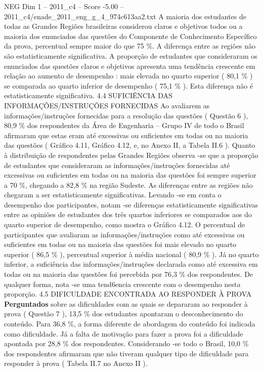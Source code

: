 \begin{textsample}{NEG Dim 1 – 2011\_c4 – Score -5.00 – 2011\_c4/enade\_2011\_eng\_g\_4\_974c613aa2.txt}
A maioria dos estudantes de todas as Grandes Regiões brasileiras considerou claros e objetivos todos ou a maioria dos enunciados das questões do Componente de Conhecimento Específico da prova, percentual sempre maior do que 75 \%.
A diferença entre as regiões não são estatisticamente significativa.
A proporção de estudantes que consideraram os enunciados das questões claros e objetivos apresenta uma tendência crescente em relação ao aumento de desempenho : mais elevada no quarto superior ( 80,1 \% ) se comparada ao quarto inferior de desempenho ( 75,1 \% ).
Esta diferença não é estatisticamente significativa. 4.4 SUFICIÊNCIA DAS INFORMAÇÕES/INSTRUÇÕES FORNECIDAS Ao avaliarem as informações/instruções fornecidas para a resolução das questões ( Questão 6 ), 80,9 \% dos respondentes da Área de Engenharia – Grupo IV de todo o Brasil afirmaram que estas eram até excessivas ou suficientes em todas ou na maioria das questões ( Gráfico 4.11, Gráfico 4.12, e, no Anexo II, a Tabela II.6 ).
Quanto à distribuição de respondentes pelas Grandes Regiões observa -se que a proporção de estudantes que consideraram as informações/instruções fornecidas até excessivas ou suficientes em todas ou na maioria das questões foi sempre superior a 70 \%, chegando a 82,8 \% na região Sudeste.
As diferenças entre as regiões não chegaram a ser estatisticamente significativas.
Levando -se em conta o desempenho dos participantes, notam -se diferenças estatisticamente significativas entre as opiniões de estudantes dos três quartos inferiores se comparados aos do quarto superior de desempenho, como mostra o Gráfico 4.12.
O percentual de participantes que avaliaram as informações/instruções como até excessivas ou suficientes em todas ou na maioria das questões foi mais elevado no quarto superior ( 86,5 \% ), percentual superior à média nacional ( 80,9 \% ).
Já no quarto inferior, a suficiência das informações/instruções declarada como até excessiva em todas ou na maioria das questões foi percebida por 76,3 \% dos respondentes.
De qualquer forma, nota -se uma tend6encia crescente com o desempenho nesta proporção. 4.5 DIFICULDADE ENCONTRADA AO RESPONDER À PROVA \textbf{Perguntados} sobre as dificuldades com as quais se depararam ao responder à prova ( Questão 7 ), 13,5 \% dos estudantes apontaram o desconhecimento do conteúdo.
Para 36,8 \%, a forma diferente de abordagem do conteúdo foi indicada como dificuldade.
Já a falta de motivação para fazer a prova foi a dificuldade apontada por 28,8 \% dos respondentes.
Considerando -se todo o Brasil, 10,0 \% dos respondentes afirmaram que não tiveram qualquer tipo de dificuldade para responder à prova ( Tabela II.7 no Anexo II ).

\end{textsample}
